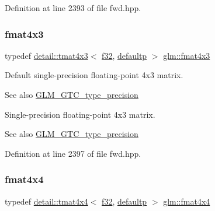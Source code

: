 Definition at line 2393 of file fwd.\+hpp.

\mbox{\label{group__gtc__type__precision_ga5af77d2574bca528d321fbf261c90107}} 
\subsubsection{\texorpdfstring{fmat4x3}{fmat4x3}}
{\footnotesize\ttfamily typedef \hyperlink{structglm_1_1detail_1_1tmat4x3}{detail\+::tmat4x3}$<$ \hyperlink{group__gtc__type__precision_ga0ec999b57f5330d9021256e96038df04}{f32}, \hyperlink{namespaceglm_a0f04f086094c747d227af4425893f545a9d21ccd8b5a009ec7eb7677befc3bf51}{defaultp} $>$ \hyperlink{group__gtc__type__precision_ga5af77d2574bca528d321fbf261c90107}{glm\+::fmat4x3}}

Default single-\/precision floating-\/point 4x3 matrix. \begin{DoxySeeAlso}{See also}
\hyperlink{group__gtc__type__precision}{G\+L\+M\+\_\+\+G\+T\+C\+\_\+type\+\_\+precision}
\end{DoxySeeAlso}
Single-\/precision floating-\/point 4x3 matrix. \begin{DoxySeeAlso}{See also}
\hyperlink{group__gtc__type__precision}{G\+L\+M\+\_\+\+G\+T\+C\+\_\+type\+\_\+precision} 
\end{DoxySeeAlso}


Definition at line 2397 of file fwd.\+hpp.

\mbox{\label{group__gtc__type__precision_gaa641dae0fcc277f028b4e48e16bbea86}} 
\subsubsection{\texorpdfstring{fmat4x4}{fmat4x4}}
{\footnotesize\ttfamily typedef \hyperlink{structglm_1_1detail_1_1tmat4x4}{detail\+::tmat4x4}$<$ \hyperlink{group__gtc__type__precision_ga0ec999b57f5330d9021256e96038df04}{f32}, \hyperlink{namespaceglm_a0f04f086094c747d227af4425893f545a9d21ccd8b5a009ec7eb7677befc3bf51}{defaultp} $>$ \hyperlink{group__gtc__type__precision_gaa641dae0fcc277f028b4e48e16bbea86}{glm\+::fmat4x4}}

